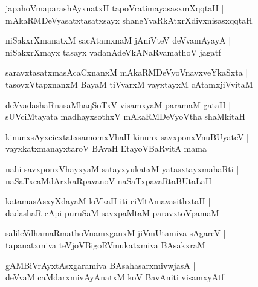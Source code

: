 \begin{shloka}
japahoVmaparashAyxnatxH tapoVratimayasasxmXqqtaH |\\
mAkaRMDeVyasatxtasatxsayx shaneYvaRkAtxrXdivxnisasxqqtaH 
\end{shloka}

\begin{shloka}
niSakxrXmanatxM sacAtamxnaM jAniVteV deVvamAyayA |\\
niSakxrXmayx tasayx vadanAdeVkANaRvamathoV jagatf 
\end{shloka}

\begin{shloka}
saravxtasatxmasAcaCxnanxM mAkaRMDeVyoVnavxveYkaSxta |\\
tasoyxVtapxnanxM BayaM tiVvarxM vayxtayxM cAtamxjiVvitaM 
\end{shloka}

\begin{shloka}
deVvadashaRnasaMhaqSoTxV visamxyaM paramaM gataH |\\
sUVciMtayata madhayxsothxV mAkaRMDeVyoVtha shaMkitaH 
\end{shloka}

\begin{shloka}
kinunxsAyxcicxtatxsamomxVhaH kinunx savxponxVnuBUyateV |\\
vayxkatxmanayxtaroV BAvaH EtayoVBaRvitA mama
\end{shloka}

\begin{shloka}
nahi savxponxVhayxyaM satayxyukatxM yatasxtayxmahaRti |\\
naSaTxcaMdArxkaRpavanoV naSaTxpavaRtaBUtaLaH 
\end{shloka}

\begin{shloka}
katamasAsxyXdayaM loVkaH iti ciMtAmavasithxtaH |\\
dadashaR cApi puruSaM savxpaMtaM paravxtoVpamaM 
\end{shloka}

\begin{shloka}
salileVdhamaRmathoVnamxganxM jiVmUtamiva sAgareV |\\
tapanatxmiva teVjoVBigoRVmukatxmiva BAsakxraM 
\end{shloka}

\begin{shloka}
gAMBiVrAyxtAsxgaramiva BAsahasarxmivwjasA |\\
deVvaM caMdarxmivAyAnatxM koV BavAniti visamxyAtf 
\end{shloka}

